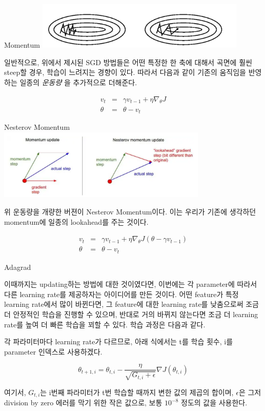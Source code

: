 \documentclass{beamer}
\begin{document}
\begin{frame}{Momentum}
\includegraphics[width=10cm,keepaspectratio]{momentum}

일반적으로, 위에서 제시된 SGD 방법들은 어떤 특정한 한 축에 대해서 곡면에 훨씬 steep할 경우, 학습이 느려지는 경향이 있다. 따라서 다음과 같이 기존의 움직임을 반영하는 일종의 \textit{운동량} 을 추가적으로 더해준다. 

\begin{eqnarray} 
v_t &=& \gamma v_{t-1} + \eta \nabla_{\theta} J \\ 
\theta &=& \theta - v_t
\end{eqnarray} 
\end{frame}

\begin{frame}{Nesterov Momentum}
\includegraphics[width=10cm,keepaspectratio]{acc}

위 운동량을 개량한 버젼이 Nesterov Momentum이다. 이는 우리가 기존에 생각하던 momentum에 일종의 lookahead를 주는 것이다. 

\begin{eqnarray} 
v_t &=& \gamma v_{t-1} + \eta \nabla_{\theta} J(\theta-\gamma v_{t-1}) \\ 
\theta &=& \theta - v_t
\end{eqnarray} 
\end{frame}


\begin{frame}{Adagrad}

이때까지는 updating하는 방법에 대한 것이였다면, 이번에는 각 parameter에 따라서 다른 learning rate를 제공하자는 아이디어를 만든 것이다. 어떤 feature가 특정 learning rate에서 많이 바뀐다면, 그 feature에 대한 learning rate를 낮춤으로써 조금 더 안정적인 학습을 진행할 수 있으며, 반대로 거의 바뀌지 않는다면 조금 더 learning rate를 높여 더 빠른 학습을 꾀할 수 있다. 학습 과정은 다음과 같다. 

각 파라미터마다 learning rate가 다르므로, 아래 식에서는 t를 학습 횟수, i를 parameter 인덱스로 사용하겠다. 

\begin{equation} 
\theta_{t+1,i} = \theta_{t,i} - \frac{\eta}{\sqrt{G_{t, i} + \epsilon}} \nabla J(\theta_{t,i})
\end{equation} 

여기서, $G_{t, i}$는 i번째 파라미터가 t번 학습할 때까지 변한 값의 제곱의 합이며, $\epsilon$은 그저 division by zero 에러를 막기 위한 작은 값으로, 보통 $10^{-8}$ 정도의 값을 사용한다. 
\end{frame}
\end{document}
